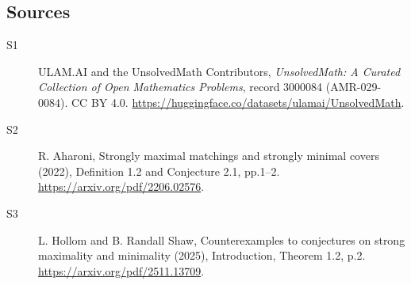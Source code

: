 \documentclass[11pt]{article}
\begin{document}
\subsection{Sources}
\begin{description}
\item[\hypertarget{source:3000084:1}{S1}] ULAM.AI and the UnsolvedMath Contributors, \emph{UnsolvedMath: A Curated Collection of Open Mathematics Problems}, record 3000084 (AMR-029-0084). CC BY 4.0. \url{https://huggingface.co/datasets/ulamai/UnsolvedMath}.
\item[\hypertarget{source:3000084:2}{S2}] R. Aharoni, Strongly maximal matchings and strongly minimal covers (2022), Definition 1.2 and Conjecture 2.1, pp.1--2. \url{https://arxiv.org/pdf/2206.02576}.
\item[\hypertarget{source:3000084:3}{S3}] L. Hollom and B. Randall Shaw, Counterexamples to conjectures on strong maximality and minimality (2025), Introduction, Theorem 1.2, p.2. \url{https://arxiv.org/pdf/2511.13709}.
\end{description}
\label{end:3000084}
\end{document}
